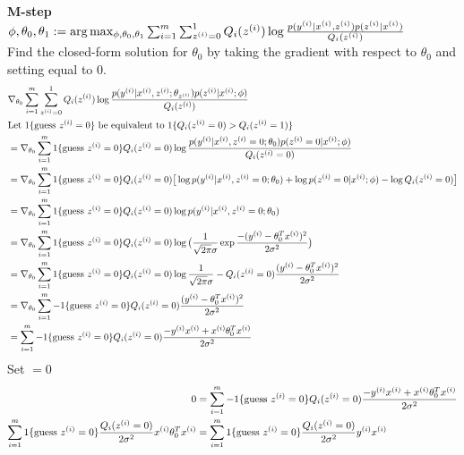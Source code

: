 \documentclass[11pt]{article}
\begin{document}
\textbf{M-step}\\
$\phi,\theta_0,\theta_1 := \arg \max_{\phi,\theta_0,\theta_1} \sum_{i=1}^m \sum_{z^{(i)}=0}^{1} Q_i(z^{(i)}) \log \frac{p(y^{(i)}|x^{(i)},z^{(i)})p(z^{(i)}|x^{(i)})}{Q_i(z^{(i)})}$\\
Find the closed-form solution for $\theta_0$ by taking the gradient with respect to $\theta_0$ and setting equal to $0$.
\begin{align*}
    &\nabla_{\theta_0} \sum_{i=1}^m \sum_{z^{(i)}=0}^{1} Q_i(z^{(i)}) \log \frac{p(y^{(i)}|x^{(i)},z^{(i)};\theta_{z^{(i)}})p(z^{(i)}|x^{(i)};\phi)}{Q_i(z^{(i)})} \\
    &\text{Let $1\{\text{guess } z^{(i)} = 0\}$ be equivalent to $1\{Q_i(z^{(i)} = 0) > Q_i(z^{(i)} = 1)\}$} \\
    &= \nabla_{\theta_0} \sum_{i=1}^m 1\{\text{guess } z^{(i)} = 0\} Q_i(z^{(i)} = 0) \log \frac{p(y^{(i)}|x^{(i)},z^{(i)}=0;\theta_0) p(z^{(i)}=0|x^{(i)};\phi)}{Q_i(z^{(i)}=0)} \\
    &= \nabla_{\theta_0} \sum_{i=1}^m 1\{\text{guess } z^{(i)} = 0\} Q_i(z^{(i)} = 0) \big[ \log p(y^{(i)}|x^{(i)},z^{(i)}=0;\theta_0) + \log p(z^{(i)}=0|x^{(i)};\phi) - \log Q_i(z^{(i)}=0) \big] \\
    &= \nabla_{\theta_0} \sum_{i=1}^m 1\{\text{guess } z^{(i)} = 0\} Q_i(z^{(i)}=0) \log p(y^{(i)}|x^{(i)},z^{(i)}=0;\theta_0) \\
    &= \nabla_{\theta_0} \sum_{i=1}^m 1\{\text{guess } z^{(i)} = 0\} Q_i(z^{(i)}=0) \log \big( \frac{1}{\sqrt{2 \pi} \sigma} \exp{\frac{-(y^{(i)}-\theta_0^T x^{(i)})^2}{2 \sigma^2}}\big) \\
    &= \nabla_{\theta_0} \sum_{i=1}^m 1\{\text{guess } z^{(i)} = 0\} Q_i(z^{(i)}=0) \log \frac{1}{\sqrt{2 \pi} \sigma} - Q_i(z^{(i)}=0) \frac{(y^{(i)}-\theta_0^T x^{(i)})^2}{2 \sigma^2} \\
    &= \nabla_{\theta_0} \sum_{i=1}^m - 1\{\text{guess } z^{(i)} = 0\} Q_i(z^{(i)}=0) \frac{(y^{(i)}-\theta_0^T x^{(i)})^2}{2 \sigma^2} \\
    &= \sum_{i=1}^m - 1\{\text{guess } z^{(i)} = 0\} Q_i(z^{(i)}=0) \frac{-y^{(i)} x^{(i)} + x^{(i)} \theta_0^T x^{(i)}}{2 \sigma^2} \\
\end{align*}
Set $= 0$ \\
\begin{align*}
    0 &= \sum_{i=1}^m - 1\{\text{guess } z^{(i)} = 0\} Q_i(z^{(i)}=0) \frac{-y^{(i)} x^{(i)} + x^{(i)} \theta_0^T x^{(i)}}{2 \sigma^2} \\
    \sum_{i=1}^m 1\{\text{guess } z^{(i)} = 0\} \frac{Q_i(z^{(i)} = 0)}{2 \sigma^2} x^{(i)} \theta_0^T x^{(i)} &= \sum_{i=1}^m 1\{\text{guess } z^{(i)} = 0\} \frac{Q_i(z^{(i)} = 0)}{2 \sigma^2} y^{(i)} x^{(i)} \\
\end{align*}
\end{document}
